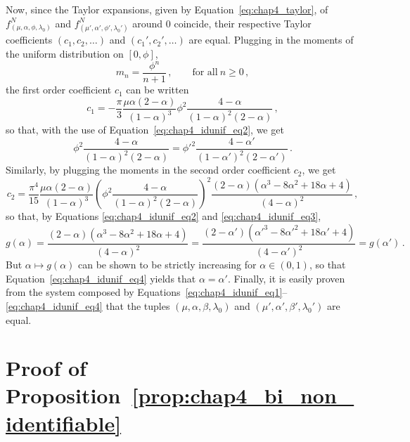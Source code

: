 \begin{subappendices}
Now, since the Taylor expansions, given by Equation~\eqref{eq:chap4_taylor}, of $f_{(\mu, \alpha, \phi, \lambda_0)}^N$ and $f_{(\mu', \alpha', \phi', \lambda_0')}^N$ around 0 coincide, their respective Taylor coefficients $(c_1, c_2, \ldots)$ and $(c_1', c_2', \ldots)$ are equal.
Plugging in the moments of the uniform distribution on $[0, \phi]$, 
\begin{equation*}
  m_n = \frac{\phi^n}{n+1}\,, \qquad \text{for all}~n \ge 0\,,
\end{equation*}
the first order coefficient $c_1$ can be written
\begin{equation*}
  c_1 = - \frac{\pi}{3} \frac{\mu\alpha(2-\alpha)}{(1-\alpha)^3} \phi^2 \frac{4-\alpha}{(1-\alpha)^2 (2-\alpha)}\,,
\end{equation*}
so that, with the use of Equation~\eqref{eq:chap4_idunif_eq2}, we get
\begin{equation}\label{eq:chap4_idunif_eq3}
  \phi^2 \frac{4-\alpha}{(1-\alpha)^2 (2-\alpha)} = \phi'^2 \frac{4-\alpha'}{(1-\alpha')^2 (2-\alpha')}\,.
\end{equation}
Similarly, by plugging the moments in the second order coefficient $c_2$, we get 
\begin{equation*}
  c_2 = \frac{\pi^4}{15} \frac{\mu\alpha(2-\alpha)}{(1-\alpha)^3} \left( \phi^2 \frac{4-\alpha}{(1-\alpha)^2(2-\alpha)} \right)^2 \frac{(2-\alpha)(\alpha^3 - 8\alpha^2 + 18\alpha + 4)}{(4 - \alpha)^2}\,,
\end{equation*}
so that, by Equations \eqref{eq:chap4_idunif_eq2} and \eqref{eq:chap4_idunif_eq3},
\begin{equation}\label{eq:chap4_idunif_eq4}
  g(\alpha) = \frac{(2-\alpha)(\alpha^3 - 8\alpha^2 + 18\alpha + 4)}{(4 - \alpha)^2} = \frac{(2-\alpha')(\alpha'^3 - 8\alpha'^2 + 18\alpha' + 4)}{(4 - \alpha')^2} = g(\alpha')\,.
\end{equation}
But $\alpha \mapsto g(\alpha)$ can be shown to be strictly increasing for $\alpha \in (0, 1)$, so that Equation~\eqref{eq:chap4_idunif_eq4} yields that $\alpha = \alpha'$.
Finally, it is easily proven from the system composed by Equations~\eqref{eq:chap4_idunif_eq1}--\eqref{eq:chap4_idunif_eq4} that the tuples $(\mu, \alpha, \beta, \lambda_0)$ and $(\mu', \alpha', \beta', \lambda_0')$ are equal.


\section{Proof of Proposition~\ref{prop:chap4_bi_non_identifiable}}\label{appendix:chap4_bi_non_identifiable}


\end{subappendices}
